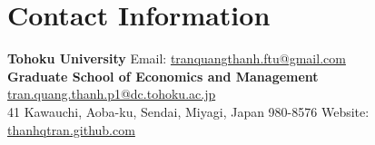 \section{\sc Contact Information}
{\bf Tohoku University}     \hfill  Email: \href{mailto:tranquangthanh.ftu@gmail.com}{tranquangthanh.ftu@gmail.com}\\
{\bf Graduate School of Economics and Management}  	 		\hfill \href{mailto:tran.quang.thanh.p1@dc.tohoku.ac.jp}{tran.quang.thanh.p1@dc.tohoku.ac.jp}\\
41 Kawauchi, Aoba-ku, Sendai, Miyagi, Japan 980-8576 \hfill Website: \href{https://thanhqtran.github.com}{thanhqtran.github.com} \\
\\


